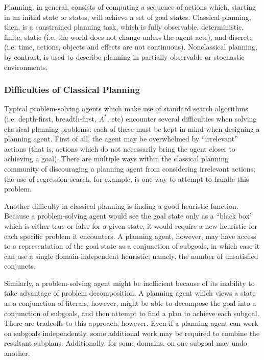 Planning, in general, consists of computing a sequence of actions which, starting in an initial state or states, will achieve a set of goal states. Classical planning, then, is a constrained planning task, which is fully observable, deterministic, finite, static (i.e. the world does not change unless the agent acts), and discrete (i.e. time, actions, objects and effects are not continuous). Nonclassical planning, by contrast, is used to describe planning in partially observable or stochastic environments. 

\subsubsection{Difficulties of Classical Planning}

Typical problem-solving agents which make use of standard search algorithms (i.e. depth-first, breadth-first, $A^*$, etc) encounter several difficulties when solving classical planning problems; each of these must be kept in mind when designing a planning agent. First of all, the agent may be overwhelmed by ``irrelevant'' actions (that is, actions which do not necessarily bring the agent closer to achieving a goal). There are multiple ways within the classical planning community of discouraging a planning agent from considering irrelevant actions; the use of regression search, for example, is one way to attempt to handle this problem. 

Another difficulty in classical planning is finding a good heuristic function. Because a problem-solving agent would see the goal state only as a ``black box'' which is either true or false for a given state, it would require a new heuristic for each specific problem it encounters. A planning agent, however, may have access to a representation of the goal state as a conjunction of subgoals, in which case it can use a single domain-independent heuristic; namely, the number of unsatisfied conjuncts. 

Similarly, a problem-solving agent might be inefficient because of its inability to take advantage of problem decomposition. A planning agent which views a state as a conjunction of literals, however, might be able to decompose the goal into a conjunction of subgoals, and then attempt to find a plan to achieve each subgoal. There are tradeoffs to this approach, however. Even if a planning agent can work on subgoals independently, some additional work may be required to combine the resultant subplans. Additionally, for some domains, on one subgoal may undo another.

